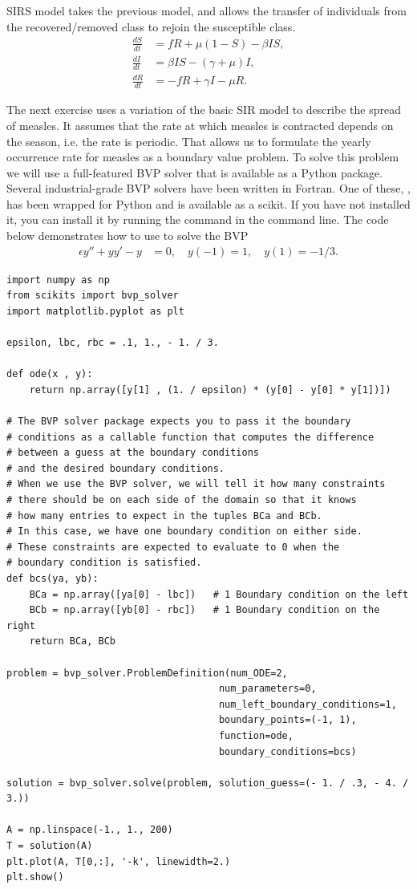 SIRS model takes the previous model, and allows the transfer of individuals from the recovered/removed class to rejoin the susceptible class.
\begin{align*}
\frac{dS}{dt} &= fR + \mu(1 -S) - \beta I S,\\
\frac{dI}{dt} &= \beta I S - (\gamma + \mu)I, \\
\frac{dR}{dt} &= -fR + \gamma I - \mu R.
\end{align*}

The next exercise uses a variation of the basic SIR model to describe the spread of measles.
It assumes that the rate at which measles is contracted depends on the season, i.e. the rate is periodic.
That allows us to formulate the yearly occurrence rate for measles as a boundary value problem.
To solve this problem we will use a full-featured BVP solver that is available as a Python package.
Several industrial-grade BVP solvers have been written in Fortran.
One of these, , has been wrapped for Python and is available as a scikit.
If you have not installed it, you can install it by running the command  in the command line.
The code below demonstrates how to use  to solve the BVP
\begin{align*}
	\epsilon y'' + yy' - y &= 0, \quad y(-1) = 1, \quad y(1) = -1/3.
\end{align*}

\begin{lstlisting}
import numpy as np
from scikits import bvp_solver
import matplotlib.pyplot as plt

epsilon, lbc, rbc = .1, 1., - 1. / 3.

def ode(x , y):
    return np.array([y[1] , (1. / epsilon) * (y[0] - y[0] * y[1])])

# The BVP solver package expects you to pass it the boundary
# conditions as a callable function that computes the difference
# between a guess at the boundary conditions
# and the desired boundary conditions.
# When we use the BVP solver, we will tell it how many constraints
# there should be on each side of the domain so that it knows
# how many entries to expect in the tuples BCa and BCb.
# In this case, we have one boundary condition on either side.
# These constraints are expected to evaluate to 0 when the
# boundary condition is satisfied.
def bcs(ya, yb):
    BCa = np.array([ya[0] - lbc])   # 1 Boundary condition on the left
    BCb = np.array([yb[0] - rbc])   # 1 Boundary condition on the right
    return BCa, BCb

problem = bvp_solver.ProblemDefinition(num_ODE=2,
                                     num_parameters=0,
                                     num_left_boundary_conditions=1,
                                     boundary_points=(-1, 1),
                                     function=ode,
                                     boundary_conditions=bcs)

solution = bvp_solver.solve(problem, solution_guess=(- 1. / .3, - 4. / 3.))

A = np.linspace(-1., 1., 200)
T = solution(A)
plt.plot(A, T[0,:], '-k', linewidth=2.)
plt.show()
\end{lstlisting}

